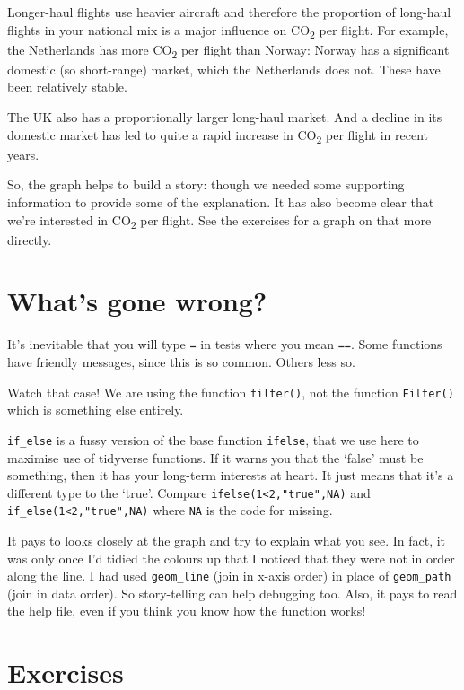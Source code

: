 \documentclass[
]{book}
\begin{document}
Longer-haul flights use heavier aircraft and therefore the proportion of long-haul flights in your national mix is a major influence on CO\textsubscript{2} per flight. For example, the Netherlands has more CO\textsubscript{2} per flight than Norway: Norway has a significant domestic (so short-range) market, which the Netherlands does not. These have been relatively stable.

The UK also has a proportionally larger long-haul market. And a decline in its domestic market has led to quite a rapid increase in CO\textsubscript{2} per flight in recent years.

So, the graph helps to build a story: though we needed some supporting information to provide some of the explanation. It has also become clear that we're interested in CO\textsubscript{2} per flight. See the exercises for a graph on that more directly.

\hypertarget{whats-gone-wrong-3}{%
\section{What's gone wrong?}\label{whats-gone-wrong-3}}

It's inevitable that you will type \texttt{=} in tests where you mean \texttt{==}. Some functions have friendly messages, since this is so common. Others less so.

Watch that case! We are using the function \texttt{filter()}, not the function \texttt{Filter()} which is something else entirely.

\texttt{if\_else} is a fussy version of the base function \texttt{ifelse}, that we use here to maximise use of tidyverse functions. If it warns you that the `false' must be something, then it has your long-term interests at heart. It just means that it's a different type to the `true'. Compare \texttt{ifelse(1\textless{}2,"true",NA)} and \texttt{if\_else(1\textless{}2,"true",NA)} where \texttt{NA} is the code for missing.

It pays to looks closely at the graph and try to explain what you see. In fact, it was only once I'd tidied the colours up that I noticed that they were not in order along the line. I had used \texttt{geom\_line} (join in x-axis order) in place of \texttt{geom\_path} (join in data order). So story-telling can help debugging too. Also, it pays to read the help file, even if you think you know how the function works!

\hypertarget{exercises}{%
\section{Exercises}\label{exercises}}
\end{document}
